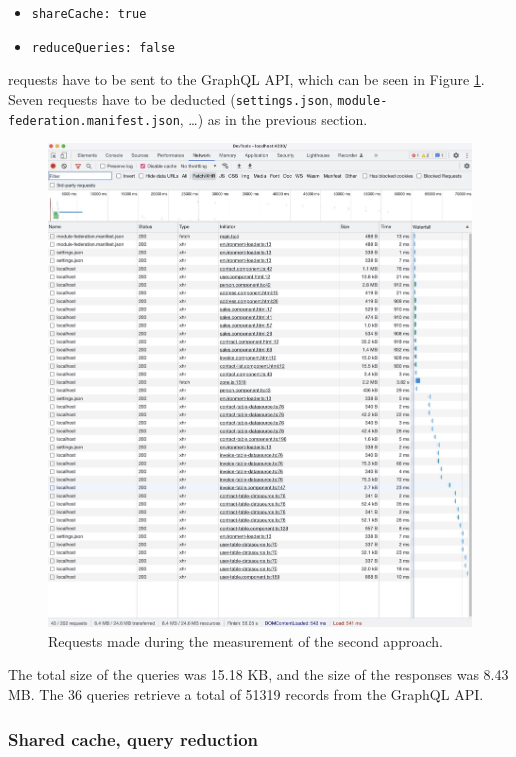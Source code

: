 \begin{itemize}
  \item \texttt{shareCache: true}
  \item \texttt{reduceQueries: false}
\end{itemize}

 requests have to be sent to the GraphQL \ac{API}, which can be seen in Figure \ref{fig:results:shared-cache-no-reduction}. Seven requests have to be deducted (\texttt{settings.json}, \texttt{module-federation.manifest.json}, \dots) as in the previous section.

\ifshowImages
\begin{figure}[H]
  \centering
  \includegraphics[width=0.75\linewidth]{images/results/1-attempt/shared-not-reduced-cache.jpg}
  \caption{Requests made during the measurement of the second approach.}\label{fig:results:shared-cache-no-reduction}
\end{figure}
\fi

\noindent The total size of the queries was 15.18 KB, and the size of the responses was 8.43 MB. The 36 queries retrieve a total of 51319 records from the GraphQL \ac{API}.

\subsubsection{Shared cache, query reduction}\label{subsubsection:results:performance-measurement:separate-cache-reduction}

